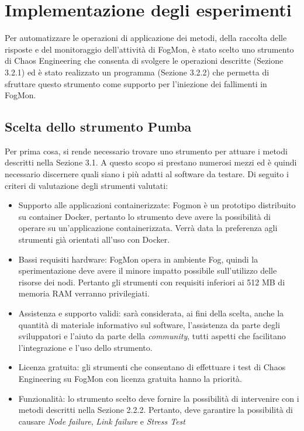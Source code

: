     \section{Implementazione degli esperimenti}
    Per automatizzare le operazioni di applicazione dei metodi, della raccolta delle risposte e del monitoraggio dell'attività di FogMon, è stato scelto uno strumento di Chaos Engineering che consenta di svolgere le operazioni descritte (Sezione 3.2.1) ed è stato realizzato un programma (Sezione 3.2.2) che permetta di sfruttare questo strumento come supporto per l'iniezione dei fallimenti in FogMon.
        \subsection{Scelta dello strumento Pumba}
        \label{subsec:pumba}
        Per prima cosa, si rende necessario trovare uno strumento per attuare i metodi descritti nella Sezione 3.1. A questo scopo si prestano numerosi mezzi ed è quindi necessario discernere quali siano i più adatti al software da testare.
        Di seguito i criteri di valutazione degli strumenti valutati:
        \begin {itemize}
            \item Supporto alle applicazioni containerizzate: Fogmon è un prototipo distribuito su container Docker, pertanto lo strumento deve avere la possibilità di operare su un'applicazione containerizzata. Verrà data la preferenza agli strumenti già orientati all'uso con Docker.
            
            \item Bassi requisiti hardware: FogMon opera in ambiente Fog, quindi la sperimentazione deve avere il minore impatto possibile sull'utilizzo delle risorse dei nodi.  Pertanto gli strumenti con requisiti inferiori ai 512 MB di memoria RAM verranno privilegiati.
            
            \item Assistenza e supporto validi: sarà considerata, ai fini della scelta, anche la quantità di materiale informativo sul software, l'assistenza da parte degli sviluppatori e l'aiuto da parte della \textit{community}, tutti aspetti che facilitano l'integrazione e l'uso dello strumento.
            
            \item Licenza gratuita: gli strumenti che consentano di effettuare i test di Chaos Engineering su FogMon con licenza gratuita hanno la priorità.
            
            \item Funzionalità: lo strumento scelto deve fornire la possibilità di intervenire con i metodi descritti nella Sezione 2.2.2. Pertanto, deve garantire la possibilità di causare \textit{Node failure}, \textit{Link failure} e \textit{Stress Test}
        \end {itemize}
